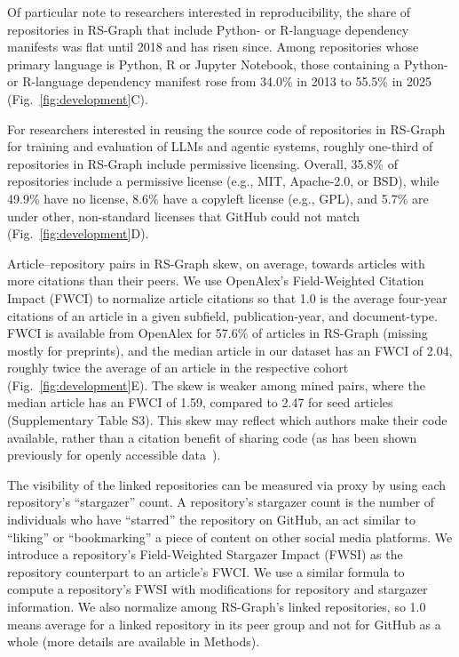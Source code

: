 \documentclass[pdflatex,sn-nature]{sn-jnl}%
\begin{document}
Of particular note to researchers interested in reproducibility, the share of repositories in RS-Graph that include Python- or R-language dependency manifests was flat until 2018 and has risen since. Among repositories whose primary language is Python, R or Jupyter Notebook, those containing a Python- or R-language dependency manifest rose from 34.0\% in 2013 to 55.5\% in 2025 (Fig.~\ref{fig:development}C).

For researchers interested in reusing the source code of repositories in RS-Graph for training and evaluation of LLMs and agentic systems, roughly one-third of repositories in RS-Graph include permissive licensing. Overall, 35.8\% of repositories include a permissive license (e.g., MIT, Apache-2.0, or BSD), while 49.9\% have no license, 8.6\% have a copyleft license (e.g., GPL), and 5.7\% are under other, non-standard licenses that GitHub could not match (Fig.~\ref{fig:development}D).

Article--repository pairs in RS-Graph skew, on average, towards articles with more citations than their peers. We use OpenAlex's Field-Weighted Citation Impact (FWCI) to normalize article citations so that 1.0 is the average four-year citations of an article in a given subfield, publication-year, and document-type. FWCI is available from OpenAlex for 57.6\% of articles in RS-Graph (missing mostly for preprints), and the median article in our dataset has an FWCI of 2.04, roughly twice the average of an article in the respective cohort (Fig.~\ref{fig:development}E). The skew is weaker among mined pairs, where the median article has an FWCI of 1.59, compared to 2.47 for seed articles (Supplementary Table S3). This skew may reflect which authors make their code available, rather than a citation benefit of sharing code (as has been shown previously for openly accessible data~\cite{colavizza2020citation}).

The visibility of the linked repositories can be measured via proxy by using each repository's ``stargazer'' count. A repository's stargazer count is the number of individuals who have ``starred'' the repository on GitHub, an act similar to ``liking'' or ``bookmarking'' a piece of content on other social media platforms. We introduce a repository's Field-Weighted Stargazer Impact (FWSI) as the repository counterpart to an article's FWCI. We use a similar formula to compute a repository's FWSI with modifications for repository and stargazer information. We also normalize among RS-Graph's linked repositories, so 1.0 means average for a linked repository in its peer group and not for GitHub as a whole (more details are available in Methods).
\end{document}
